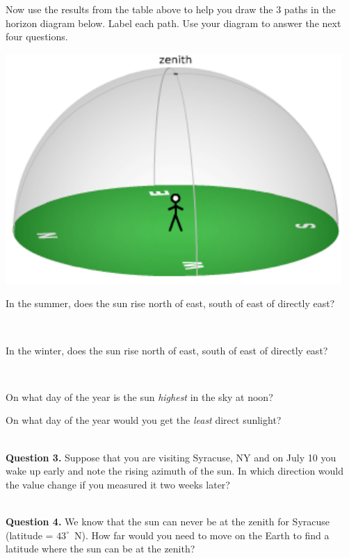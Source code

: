 \documentclass[11pt]{article}
\begin{document}
\noindent
Now use the results from the table above to help you draw the 3 paths in the horizon diagram below. Label each path. Use your diagram to answer the next four questions.
\vspace*{-0.3cm}
\begin{center}
\includegraphics{local_sky}
\end{center}

\noindent
In the summer, does the sun rise north of east, south of east of directly east?
\vspace*{0.5cm}

\hrulefill\\
\noindent

\noindent
In the winter, does the sun rise north of east, south of east of directly east?
\vspace*{0.5cm}

\hrulefill\\
\noindent

\noindent
On what day of the year is the sun \emph{highest} in the sky at noon?
\vspace*{0.5cm}

\noindent
On what day of the year would you get the \emph{least} direct sunlight?
\vspace*{0.5cm}

\hrulefill\\

\noindent
\textbf{Question 3.}
Suppose that you are visiting Syracuse, NY and on July 10 you wake up early and note the rising azimuth of the sun. In which direction would the value change if you measured it two weeks later?
\vspace*{0.5cm}

\hrulefill\\
\noindent
\textbf{Question 4.}
We know that the sun can never be at the zenith for Syracuse (latitude = $43^\circ$~N). How far would you need to move on the Earth to find a latitude where the sun can be at the zenith?
\vspace*{0.5cm}
\end{document}
